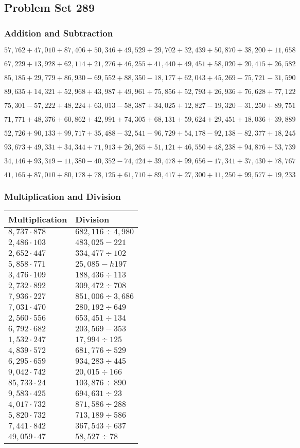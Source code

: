 \hypertarget{problem-set-289}{%
\subsection{Problem Set 289}\label{problem-set-289}}

\hypertarget{addition-and-subtraction}{%
\subsubsection{Addition and
Subtraction}\label{addition-and-subtraction}}

\(57,762+47,010+87,406+50,346+49,529+29,702+32,439+50,870+38,200+11,658\)

\(67,229+13,928+62,114+21,276+46,255+41,440+49,451+58,020+20,415+26,582\)

\(85,185+29,779+86,930-69,552+88,350-18,177+62,043+45,269-75,721-31,590\)

\(89,635+14,321+52,968+43,987+49,961+75,856+52,793+26,936+76,628+77,122\)

\(75,301-57,222+48,224+63,013-58,387+34,025+12,827-19,320-31,250+89,751\)

\(71,771+48,376+60,862+42,991+74,305+68,131+59,624+29,451+18,036+39,889\)

\(52,726+90,133+99,717+35,488-32,541-96,729+54,178-92,138-82,377+18,245\)

\(93,673+49,331+34,344+71,913+26,265+51,121+46,550+48,238+94,876+53,739\)

\(34,146+93,319-11,380-40,352-74,424+39,478+99,656-17,341+37,430+78,767\)

\(41,165+87,010+80,178+78,125+61,710+89,417+27,300+11,250+99,577+19,233\)

\hypertarget{multiplication-and-division}{%
\subsubsection{Multiplication and
Division}\label{multiplication-and-division}}

\begin{longtable}[]{@{}ll@{}}
\toprule
Multiplication & Division\tabularnewline
\midrule
\endhead
\(8,737\cdot878\) & \(682,116÷4,980\)\tabularnewline
\(2,486\cdot103\) & \(483,025 - 221\)\tabularnewline
\(2,652\cdot447\) & \(334,477÷102\)\tabularnewline
\(5,858\cdot771\) & \(25,085 -h 197\)\tabularnewline
\(3,476\cdot109\) & \(188,436÷113\)\tabularnewline
\(2,732\cdot892\) & \(309,472÷708\)\tabularnewline
\(7,936\cdot227\) & \(851,006÷3,686\)\tabularnewline
\(7,031\cdot470\) & \(280,192÷649\)\tabularnewline
\(2,560\cdot556\) & \(653,451÷134\)\tabularnewline
\(6,792\cdot682\) & \(203,569- 353\)\tabularnewline
\(1,532\cdot247\) & \(17,994÷125\)\tabularnewline
\(4,839\cdot572\) & \(681,776÷529\)\tabularnewline
\(6,295\cdot659\) & \(934,283÷445\)\tabularnewline
\(9,042\cdot742\) & \(20,015÷166\)\tabularnewline
\(85,733\cdot24\) & \(103,876÷890\)\tabularnewline
\(9,583\cdot425\) & \(694,631÷23\)\tabularnewline
\(4,017\cdot732\) & \(871,586÷288\)\tabularnewline
\(5,820\cdot732\) & \(713,189÷586\)\tabularnewline
\(7,441\cdot842\) & \(367,543÷637\)\tabularnewline
\(49,059\cdot47\) & \(58,527÷78\)\tabularnewline
\bottomrule
\end{longtable}
